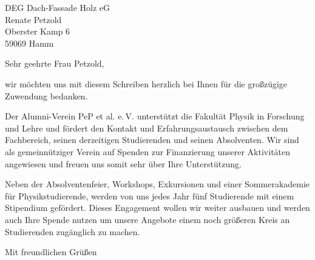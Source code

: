 \documentclass[
  pepbrief,
  fontsize=12pt,
  paper=a4,
  DIV=14,
  parskip=half,
  backaddress=false,
]{scrlttr2}
\author{Sascha Dungs}
\begin{document}
\begin{letter}{%
  DEG Dach-Fassade Holz eG\\
  Renate Petzold\\
  Oberster Kamp 6\\
  59069 Hamm%
}
\opening{Sehr geehrte Frau Petzold,}
wir möchten uns mit diesem Schreiben herzlich bei Ihnen für die großzügige Zuwendung bedanken. 

Der Alumni-Verein PeP et al. e.\,V. unterstützt die Fakultät Physik in Forschung und Lehre und fördert den Kontakt und Erfahrungsaustausch zwischen dem Fachbereich,
seinen derzeitigen Studierenden und seinen Absolventen.
Wir sind als gemeinnütziger Verein auf Spenden zur Finanzierung unserer Aktivitäten angewiesen und freuen uns somit sehr über Ihre Unterstützung. 

Neben der Absolventenfeier, Workshops, Exkursionen und einer Sommerakademie für Physikstudierende, werden von uns jedes Jahr fünf Studierende mit einem Stipendium gefördert.
Dieses Engagement wollen wir weiter ausbauen und werden auch Ihre Spende nutzen um unsere Angebote einem noch größeren Kreis an Studierenden zugänglich zu machen.

\closing{Mit freundlichen Grüßen}

\end{letter}
\end{document}
